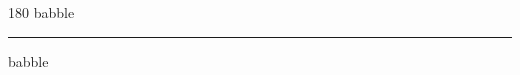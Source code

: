
\begin{frame}
\begin{center}
\begin{turn}{180}
{\fontsize{2.5cm}{1em}\selectfont babble}
\end{turn}
\vspace{1em}\par  
\hrule
\vspace{1em}\par  
{\fontsize{2.5cm}{1em}\selectfont babble}
\end{center}
\end{frame}
